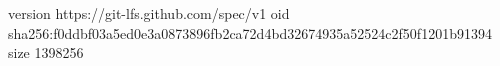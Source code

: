 version https://git-lfs.github.com/spec/v1
oid sha256:f0ddbf03a5ed0e3a0873896fb2ca72d4bd32674935a52524c2f50f1201b91394
size 1398256
